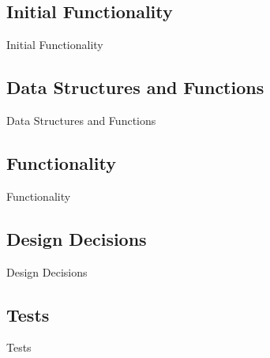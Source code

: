 \subsection{Initial Functionality}

Initial Functionality
  

\subsection{Data Structures and Functions}
  
Data Structures and Functions

\subsection{Functionality}
  
Functionality

\subsection{Design Decisions}
  
Design Decisions

\subsection{Tests}

Tests